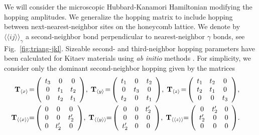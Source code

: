 We will consider the microscopic Hubbard-Kanamori Hamiltonian modifying the hopping amplitudes.
We generalize the hopping matrix to include hopping between next-nearest-neighbor sites on the honeycomb lattice. We denote by $\langle \langle ij\rangle\rangle_\gamma$ a second-neighbor bond perpendicular to nearest-neighbor  $\gamma$ bonds, see Fig.~\ref{fig:triang-jkl}. Sizeable second- and third-neighbor hopping parameters have been calculated for Kitaev materials using {\it ab initio} methods \cite{Winter_2016,Winter2017rev}. For simplicity,  we consider only the dominant second-neighbor hopping given by the matrices
\begin{equation}
\begin{split}
    \hspace*{-5mm}
        \mathbf{T}_{\braket{x}}    \!&=  \!
    \left(
    \begin{array}{ccc}
         t_3 & 0  & 0 \\
         0 & t_1  & t_2 \\
         0 & t_2  & t_1 \\
    \end{array}
    \right)  \!, \;
        \mathbf{T}_{\braket{y}}  \! =  \!
    \left(
    \begin{array}{ccc}
         t_1 & 0  & t_2 \\
         0 & t_3  & 0 \\
         t_2 & 0  & t_1 \\
    \end{array}
    \right) \!, \;
    \mathbf{T}_{\braket{z}}  \! = \!
    \left(
    \begin{array}{ccc}
         t_1 & t_2  & 0 \\
         t_2 & t_1  & 0 \\
         0 & 0  & t_3 \\
    \end{array}
    \right) \!, \\ \hspace*{-5mm}
    \mathbf{T}_{\braket{\braket{x}}} \! \! &=  \!
    \left(
    \begin{array}{ccc}
         0 & 0  & 0 \\
         0 & 0  & t_2' \\
         0 & t_2'  & 0 \\
    \end{array}
    \right)  \!, \;
        \mathbf{T}_{\braket{\braket{y}}} \!\! = \!
    \left(
    \begin{array}{ccc}
         0 & 0  & t_2' \\
         0 & 0  & 0 \\
         t_2' & 0  & 0 \\
    \end{array}
    \right) \!, \;
    \mathbf{T}_{\braket{\braket{z}}}  \!\! =  \!
    \left(
    \begin{array}{ccc}
         0 & t_2'  & 0 \\
         t_2' & 0  & 0 \\
         0 & 0  & 0 \\
    \end{array}
    \right) \! . \label{eq:II-5-hopping}
\end{split}
\end{equation}
